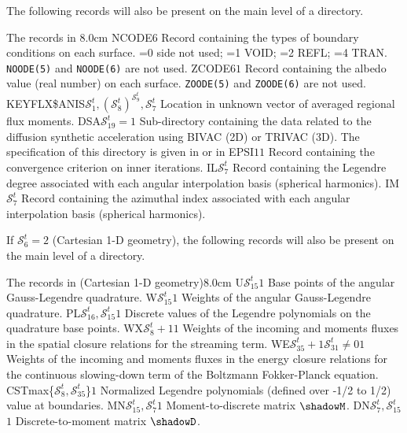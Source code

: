 The following records will also be present on the main level of a 
directory.
\begin{DescriptionEnregistrement}{The  records in
}{8.0cm}
\IntEnr
  {NCODE}{$6$}
  {Record containing the types of boundary conditions on each surface. =0 side
   not used; =1 VOID; =2 REFL; =4 TRAN. {\tt NOODE(5)} and {\tt NOODE(6)} are not used.} 
\RealEnr
  {ZCODE}{$6$}{$1$}
  {Record containing the albedo value (real number) on each surface. {\tt ZOODE(5)}
   and {\tt ZOODE(6)} are not used.} 
\IntEnr
  {KEYFLX\$ANIS}{$\mathcal{S}^t_1,(\mathcal{S}^{t}_{8})^{\mathcal{S}^{t}_{9}},\mathcal{S}^{t}_{7}$}
  {Location in unknown vector of averaged regional flux moments.} 
\OptDirEnr
  {DSA}{$\mathcal{S}^{t}_{19}= 1$}
  {Sub-directory containing the data related to the diffusion synthetic acceleration using BIVAC (2D) or TRIVAC (3D).
  The specification of this directory is given in  or in  } 
\RealEnr
  {EPSI}{$1$}{$1$}
  {Record containing the convergence criterion on inner iterations.}
\IntEnr
  {IL}{$\mathcal{S}^{t}_{7}$}
  {Record containing the Legendre degree associated with each angular interpolation basis (spherical harmonics).} 
\IntEnr
  {IM}{$\mathcal{S}^{t}_{7}$}
  {Record containing the azimuthal index associated with each angular interpolation basis (spherical harmonics).} 

\end{DescriptionEnregistrement}

If $\mathcal{S}^{t}_{6}=2$ (Cartesian 1-D geometry), the following records will also be present on the main level of a 
directory.

\begin{DescriptionEnregistrement}{The  records in
 (Cartesian 1-D geometry)}{8.0cm}
\RealEnr
  {U}{$\mathcal{S}^{t}_{15}$}{$1$}
  {Base points of the angular Gauss-Legendre quadrature.} 
\RealEnr
  {W}{$\mathcal{S}^{t}_{15}$}{$1$}
  {Weights of the angular Gauss-Legendre quadrature.} 
\RealEnr
  {PL}{$\mathcal{S}^{t}_{16},\mathcal{S}^{t}_{15}$}{$1$}
  {Discrete values of the Legendre polynomials on the quadrature base points.} 
\RealEnr
  {WX}{$\mathcal{S}^{t}_{8}+1$}{$1$}
  {Weights of the incoming and moments fluxes in the spatial closure relations for the streaming term.}
\OptRealEnr
  {WE}{$\mathcal{S}^{t}_{35}+1$}{$\mathcal{S}^{t}_{31}\neq 0$}{$1$}
  {Weights of the incoming and moments fluxes in the energy closure relations for the continuous slowing-down term of the Boltzmann Fokker-Planck equation.}
\RealEnr
  {CST}{max\{$\mathcal{S}^{t}_{8},\mathcal{S}^{t}_{35}$\}}{$1$}
  {Normalized Legendre polynomials (defined over -1/2 to 1/2) value at boundaries.}
\RealEnr
  {MN}{$\mathcal{S}^{t}_{15},\mathcal{S}^{t}_{7}$}{$1$}
  {Moment-to-discrete matrix $\shadowM$.} 
\RealEnr
  {DN}{$\mathcal{S}^{t}_{7},\mathcal{S}^{t}_{15}$}{$1$}
  {Discrete-to-moment matrix $\shadowD$.} 
\end{DescriptionEnregistrement}

